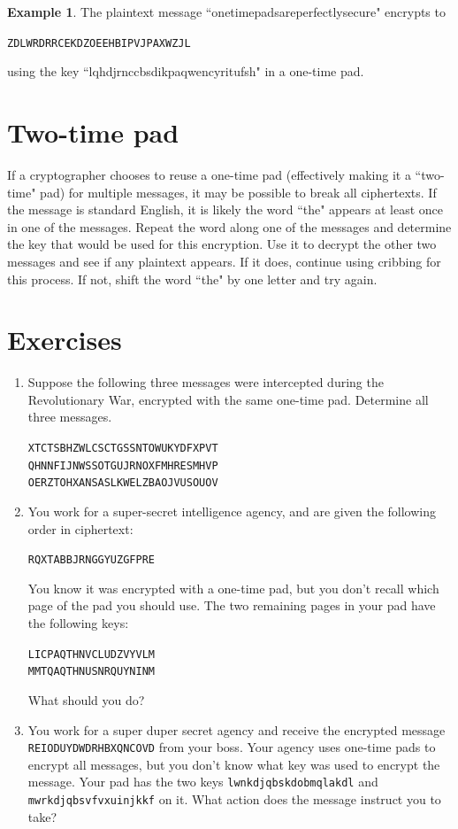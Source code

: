 \documentclass{book}
\theoremstyle{plain}
\theoremstyle{definition}
\newtheorem{example}[theorem]{Example}
\newif\ifprintsolutions
\newcommand{\solution}[1]{\ifprintsolutions \begin{sloppypar}{\it #1}\end{sloppypar} \fi} %
\newcommand{\ciphertext}[1]{\texttt{#1}} %
\newcommand{\display}[1]{\begin{sloppypar}\setlength{\parindent}{0mm}#1\end{sloppypar}} %
\newcommand{\ciphertextspace}[1]{\begin{sloppypar}\doublespacing\Large\texttt{#1}\end{sloppypar}} %
\begin{document}
\begin{example}
The plaintext message ``onetimepadsareperfectlysecure" encrypts to
\begin{center}
\ciphertext{ZDLWRDRRCEKDZOEEHBIPVJPAXWZJL}
\end{center}
using the key ``lqhdjrnccbsdikpaqwencyritufsh" in a one-time pad.
\end{example}

\section{Two-time pad}
If a cryptographer chooses to reuse a one-time pad (effectively making it a ``two-time" pad) for multiple messages, it may be possible to break all ciphertexts. If the message is standard English, it is likely the word ``the" appears at least once in one of the messages. Repeat the word along one of the messages and determine the key that would be used for this encryption. Use it to decrypt the other two messages and see if any plaintext appears. If it does, continue using cribbing for this process. If not, shift the word ``the" by one letter and try again.

\section{Exercises}
\begin{enumerate}
\item Suppose the following three messages were intercepted during the Revolutionary War, encrypted with the same one-time pad. Determine all three messages.
\display{\ciphertextspace{XTCTSBHZWLCSCTGSSNTOWUKYDFXPVT \\ QHNNFIJNWSSOTGUJRNOXFMHRESMHVP \\ OERZTOHXANSASLKWELZBAOJVUSOUOV}} \solution{At the break of dawn, seize the harbor. \\ The Brits are bunkered in Lexington. \\ Reinforcements are coming by night.}
\item You work for a super-secret intelligence agency, and are given the following order in ciphertext: \display{\ciphertextspace{RQXTABBJRNGGYUZGFPRE}} You know it was encrypted with a one-time pad, but you don't recall which page of the pad you should use. The two remaining pages in your pad have the following keys: \display{\ciphertextspace{LICPAQTHNVCLUDZVYVLM\\MMTQAQTHNUSNRQUYNINM}} What should you do? \solution{Give Alice several hugs. Feed Alice to the fishes.}
\item You work for a super duper secret agency and receive the encrypted message \ciphertext{REIODUYDWDRHBXQNCOVD} from your boss. Your agency uses one-time pads to encrypt all messages, but you don't know what key was used to encrypt the message. Your pad has the two keys \ciphertext{lwnkdjqbskdobmqlakdl} and \ciphertext{mwrkdjqbsvfvxuinjkkf} on it. What action does the message instruct you to take? \solution{The message decrypts to ``give Alice total access" under the first key and ``fire Alice immediately" under the second.}
\end{enumerate}
\end{document}
